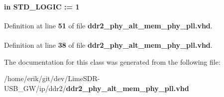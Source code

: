 \paragraph[{scanclk}]{ {\bfseries \textcolor{keywordflow}{in}\textcolor{vhdlchar}{ }} {\bfseries \textcolor{comment}{S\+T\+D\+\_\+\+L\+O\+G\+IC}\textcolor{vhdlchar}{ }\textcolor{vhdlchar}{ }\textcolor{vhdlchar}{\+:}\textcolor{vhdlchar}{=}\textcolor{vhdlchar}{ }\textcolor{vhdlchar}{ }\textcolor{vhdlchar}{\textquotesingle{}}\textcolor{vhdlchar}{ } \textcolor{vhdldigit}{1} \textcolor{vhdlchar}{ }\textcolor{vhdlchar}{\textquotesingle{}}\textcolor{vhdlchar}{ }} \hspace{0.3cm}{\ttfamily [Port]}}\label{classddr2__phy__alt__mem__phy__pll_a8ebf129701afacd7d03e5358acc7e93c}


Definition at line {\bf 51} of file {\bf ddr2\+\_\+phy\+\_\+alt\+\_\+mem\+\_\+phy\+\_\+pll.\+vhd}.

\paragraph[{std\+\_\+logic\+\_\+1164}]{\hspace{0.3cm}{\ttfamily [Package]}}\label{classddr2__phy__alt__mem__phy__pll_acd03516902501cd1c7296a98e22c6fcb}


Definition at line {\bf 38} of file {\bf ddr2\+\_\+phy\+\_\+alt\+\_\+mem\+\_\+phy\+\_\+pll.\+vhd}.



The documentation for this class was generated from the following file\+:\begin{DoxyCompactItemize}
\item 
/home/erik/git/dev/\+Lime\+S\+D\+R-\/\+U\+S\+B\+\_\+\+G\+W/ip/ddr2/{\bf ddr2\+\_\+phy\+\_\+alt\+\_\+mem\+\_\+phy\+\_\+pll.\+vhd}\end{DoxyCompactItemize}
